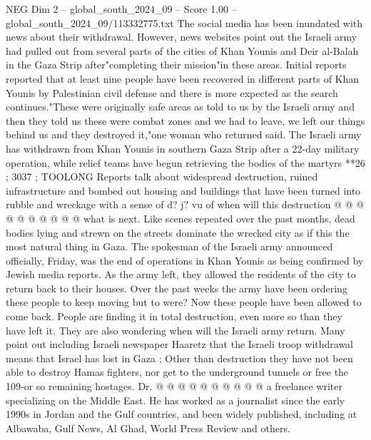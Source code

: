 \begin{textsample}{NEG Dim 2 – global\_south\_2024\_09 – Score 1.00 – global\_south\_2024\_09/113332775.txt}  \label{ex:f2_neg_410}
The social media has been inundated with news about their withdrawal.
However, news websites point out the Israeli army had pulled out from several parts of the cities of Khan Younis and Deir al-Balah in the Gaza Strip after"completing their mission"in these areas.
Initial reports reported that at least nine people have been recovered in different parts of Khan Younis by Palestinian civil defense and there is more expected as the search continues."These were originally safe areas as told to us by the Israeli army and then they told us these were combat zones and we had to leave, we left our things behind us and they destroyed it,"one woman who returned said.
The Israeli army has withdrawn from Khan Younis in southern Gaza Strip after a 22-day military operation, while relief teams have begun retrieving the bodies of the martyrs **26 ; 3037 ; TOOLONG Reports talk about widespread destruction, ruined infrastructure and bombed out housing and buildings that have been turned into rubble and wreckage with a sense of d? j? vu of when will this destruction @ @ @ @ @ @ @ @ @ @ what is next.
Like scenes repeated over the past months, dead bodies lying and strewn on the streets dominate the wrecked city as if this the most natural thing in Gaza.
The spokesman of the Israeli army announced officially, Friday, was the end of operations in Khan Younis as being confirmed by Jewish media reports.
As the army left, they allowed the residents of the city to return back to their houses.
Over the past weeks the army have been ordering these people to keep moving but to were?
Now these people have been allowed to come back.
People are finding it in total destruction, even more so than they have left it.
They are also wondering when will the Israeli army return.
Many point out including Israeli newspaper Haaretz that the Israeli troop withdrawal means that Israel has lost in Gaza ; Other than destruction they have not been able to destroy Hamas fighters, nor get to the underground tunnels or free the 109-or so remaining hostages.
Dr. @ @ @ @ @ @ @ @ @ @ a freelance writer specializing on the Middle East.
He has worked as a journalist since the early 1990s in Jordan and the Gulf countries, and been widely published, including at Albawaba, Gulf News, Al Ghad, World Press Review and others.

\end{textsample}
